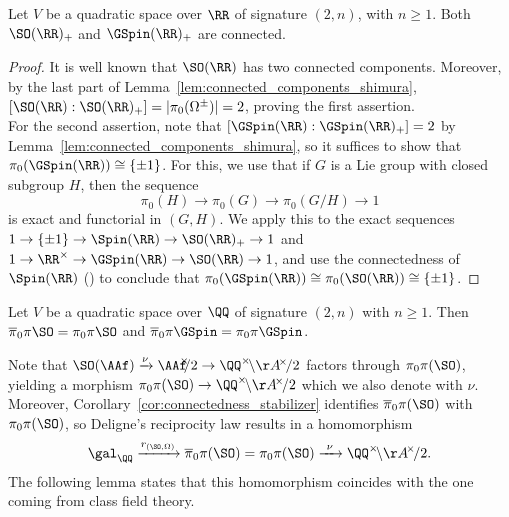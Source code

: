\begin{lemma}\label{lem:connectedness_stabilizer}
Let $V$ be a quadratic space over $\RR$ of signature $(2,n)$, with $n \geq 1$. Both $\SO(\RR)_+$ and $\GSpin(\RR)_+$ are connected.
\end{lemma}
\begin{proof}
It is well known that $\SO(\RR)$ has two connected components. Moreover, by the last part of Lemma~\ref{lem:connected_components_shimura}, $[\SO(\RR):\SO(\RR)_+] = |\pi_0(\Omega^{\pm})| = 2$, proving the first assertion. \\
For the second assertion, note that $[\GSpin(\RR):\GSpin(\RR)_+] = 2$ by Lemma~\ref{lem:connected_components_shimura}, so it suffices to show that $\pi_0(\GSpin(\RR)) \cong \{\pm 1\}$. For this, we use that if $G$ is a Lie group with closed subgroup $H$, then the sequence
$$
\pi_0(H) \rightarrow \pi_0(G) \rightarrow \pi_0(G/H) \rightarrow 1
$$
is exact and functorial in $(G,H)$. We apply this to the exact sequences $1 \rightarrow \{\pm 1\} \rightarrow \Spin(\RR) \rightarrow \SO(\RR)_+ \rightarrow 1$ and $1 \rightarrow \RR^{\times} \rightarrow \GSpin(\RR) \rightarrow \SO(\RR) \rightarrow 1$, and use the connectedness of $\Spin(\RR)$ (\cite[Proposition~7.6]{PlatonovRapinchuk}) to conclude that $\pi_0(\GSpin(\RR)) \cong \pi_0(\SO(\RR)) \cong \{\pm 1\}$.
\end{proof}

\begin{corollary}\label{cor:connectedness_stabilizer}
Let $V$ be a quadratic space over $\QQ$ of signature $(2,n)$ with $n \geq 1$. Then $\overline{\pi}_0 \pi \SO = \pi_0 \pi \SO$ and $\overline{\pi}_0 \pi \GSpin = \pi_0 \pi \GSpin$.
\end{corollary}

Note that $\SO(\AAf) \xrightarrow{\nu} \AAf^{\hspace{-5pt}\times}\hspace{-4pt}/2 \rightarrow \QQ^{\times}\!\backslash \AA^{\!\times}\!/2$ factors through $\pi_0 \pi (\SO)$, yielding a morphism $\pi_0 \pi(\SO) \rightarrow \QQ^{\times}\!\backslash\AA^{\!\times}\!/2$ which we also denote with $\nu$. Moreover, Corollary~\ref{cor:connectedness_stabilizer} identifies $\overline{\pi}_0 \pi(\SO)$ with $\pi_0 \pi(\SO)$, so Deligne's reciprocity law results in a homomorphism
$$
\gal_{\QQ} \xrightarrow{r_{(\SO,\Omega)}} \overline{\pi}_0 \pi(\SO) = \pi_0 \pi(\SO) \xrightarrow{\ \nu \ } \QQ^{\times}\!\backslash \AA^{\!\times}\!/2.
$$
The following lemma states that this homomorphism coincides with the one coming from class field theory.


